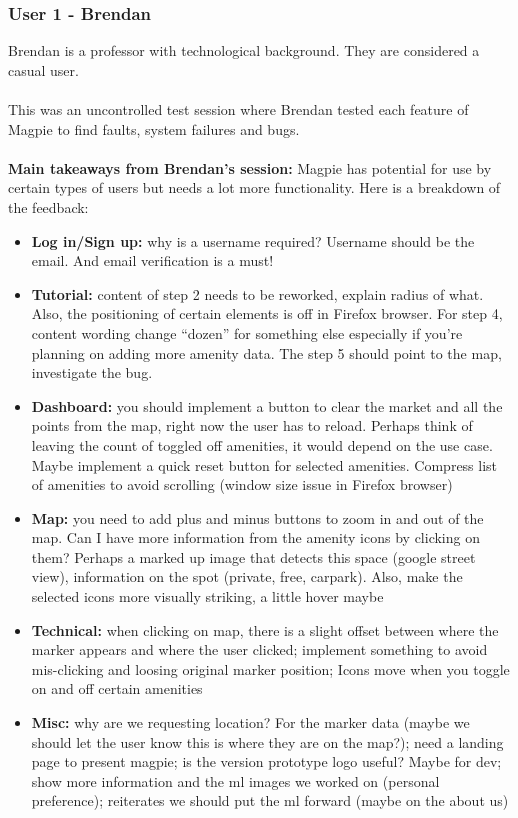 \subsubsection{User 1 - Brendan}
Brendan is a professor with technological background. They are considered a casual user.\\\\
This was an uncontrolled test session where Brendan tested each feature of Magpie to find faults, system failures and bugs.\\\\
\textbf{Main takeaways from Brendan's session: }Magpie has potential for use by certain types of users but needs a lot more functionality. Here is a breakdown of the feedback:
\begin{itemize}
    \item \textbf{Log in/Sign up: }why is a username required? Username should be the email. And email verification is a must!
    \item \textbf{Tutorial: }content of step 2 needs to be reworked, explain radius of what. Also, the positioning of certain elements is off in Firefox browser. For step 4, content wording change “dozen” for something else especially if you're planning on adding more amenity data. The step 5 should point to the map, investigate the bug.
    \item \textbf{Dashboard: }you should implement a button to clear the market and all the points from the map, right now the user has to reload. Perhaps think of leaving the count of toggled off amenities, it would depend on the use case. Maybe implement a quick reset button for  selected amenities. Compress list of amenities to avoid scrolling (window size issue in Firefox browser)
    \item \textbf{Map: } you need to add plus and minus buttons to zoom in and out of the map. Can I have more information from the amenity icons by clicking on them? Perhaps a marked up image that detects this space (google street view), information on the spot (private, free, carpark). Also, make the selected icons more visually striking, a little hover maybe
    \item \textbf{Technical: }when clicking on map, there is a slight offset between where the marker appears and where the user clicked; implement something to avoid mis-clicking and loosing original marker position; Icons move when you toggle on and off certain amenities
    \item \textbf{Misc: }why are we requesting location? For the marker data (maybe we should let the user know this is where they are on the map?); need a landing page to present magpie; is the version prototype logo useful? Maybe for dev; show more information and the ml images we worked on (personal preference); reiterates we should put the ml forward (maybe on the about us)
\end{itemize}
